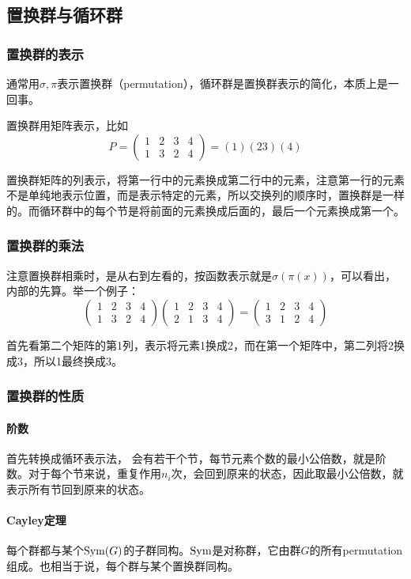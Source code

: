 \subsection{置换群与循环群}
\subsubsection{置换群的表示}通常用$\sigma,\pi$表示置换群（permutation），循环群是置换群表示的简化，本质上是一回事。

置换群用矩阵表示，比如
$$P=\begin{pmatrix}
1 & 2 & 3 & 4\\
1 & 3 & 2& 4
\end{pmatrix}=(1)(23)(4)$$

置换群矩阵的列表示，将第一行中的元素换成第二行中的元素，注意第一行的元素不是单纯地表示位置，而是表示特定的元素，所以交换列的顺序时，置换群是一样的。而循环群中的每个节是将前面的元素换成后面的，最后一个元素换成第一个。

\subsubsection{置换群的乘法}
注意置换群相乘时，是从右到左看的，按函数表示就是$\sigma(\pi(x))$，可以看出，内部的先算。举一个例子：
$$\begin{pmatrix}
1 & 2 & 3 &4\\
1 & 3 & 2 & 4
\end{pmatrix}\begin{pmatrix}
1 & 2 & 3 &4\\
2 & 1 & 3 &4
\end{pmatrix}=\begin{pmatrix}
1 & 2 & 3 &4\\
3 & 1 & 2 & 4
\end{pmatrix}$$

首先看第二个矩阵的第1列，表示将元素1换成2，而在第一个矩阵中，第二列将2换成3，所以1最终换成3。

\subsubsection{置换群的性质}
\paragraph*{阶数}首先转换成循环表示法， 会有若干个节，每节元素个数的最小公倍数，就是阶数。对于每个节来说，重复作用$n_i$次，会回到原来的状态，因此取最小公倍数，就表示所有节回到原来的状态。
\paragraph*{Cayley定理}每个群都与某个$\operatorname{Sym}(G)$的子群同构。$\operatorname{Sym}$是对称群，它由群$G$的所有permutation组成。也相当于说，每个群与某个置换群同构。

